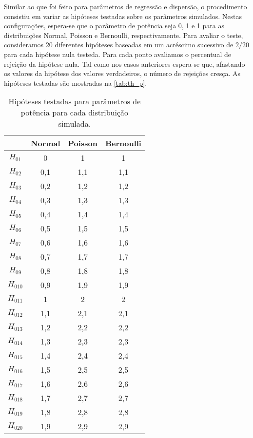 Similar ao que foi feito para parâmetros de regressão e dispersão, o procedimento consistiu em variar as hipóteses testadas sobre os parâmetros simulados. Nestas configurações, espera-se que o parâmetro de potência seja 0, 1 e 1 para as distribuições Normal, Poisson e Bernoulli, respectivamente. Para avaliar o teste, consideramos 20 diferentes hipóteses baseadas em um acréscimo sucessivo de $2/20$ para cada hipótese nula testeda. Para cada ponto avaliamos o percentual de rejeição da hipótese nula. Tal como nos casos anteriores espera-se que, afastando os valores da hipótese dos valores verdadeiros, o número de rejeições cresça. As hipóteses testadas são mostradas na \autoref{tab:th_p}.

\begin{table}[H]
\centering
\begin{tabular}{cccc}
\hline
          & Normal & Poisson & Bernoulli \\ \hline
$H_{01}$  & 0      & 1       & 1         \\
$H_{02}$  & 0,1    & 1,1     & 1,1       \\
$H_{03}$  & 0,2    & 1,2     & 1,2       \\
$H_{04}$  & 0,3    & 1,3     & 1,3       \\
$H_{05}$  & 0,4    & 1,4     & 1,4       \\
$H_{06}$  & 0,5    & 1,5     & 1,5       \\
$H_{07}$  & 0,6    & 1,6     & 1,6       \\
$H_{08}$  & 0,7    & 1,7     & 1,7       \\
$H_{09}$  & 0,8    & 1,8     & 1,8       \\
$H_{010}$ & 0,9    & 1,9     & 1,9       \\
$H_{011}$ & 1      & 2       & 2         \\
$H_{012}$ & 1,1    & 2,1     & 2,1       \\
$H_{013}$ & 1,2    & 2,2     & 2,2       \\
$H_{014}$ & 1,3    & 2,3     & 2,3       \\
$H_{015}$ & 1,4    & 2,4     & 2,4       \\
$H_{016}$ & 1,5    & 2,5     & 2,5       \\
$H_{017}$ & 1,6    & 2,6     & 2,6       \\
$H_{018}$ & 1,7    & 2,7     & 2,7       \\
$H_{019}$ & 1,8    & 2,8     & 2,8       \\
$H_{020}$ & 1,9    & 2,9     & 2,9       \\ \hline
\end{tabular}
\caption{Hipóteses testadas para parâmetros de potência para cada distribuição simulada.}
\label{tab:th_p}
\end{table}


